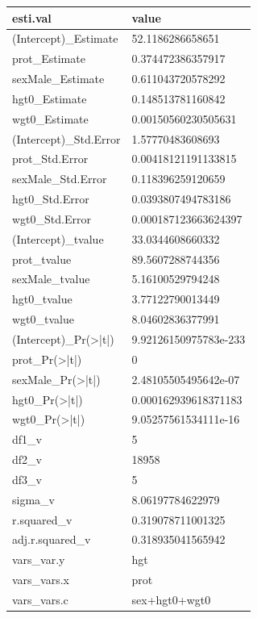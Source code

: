 \documentclass[
]{book}
\begin{document}
\begin{table}[!h]
\centering
\begin{tabular}{l|l}
\hline
esti.val & value\\
\hline
\rowcolor{gray!6}  (Intercept)\_Estimate & 52.1186286658651\\
\hline
prot\_Estimate & 0.374472386357917\\
\hline
\rowcolor{gray!6}  sexMale\_Estimate & 0.611043720578292\\
\hline
hgt0\_Estimate & 0.148513781160842\\
\hline
\rowcolor{gray!6}  wgt0\_Estimate & 0.00150560230505631\\
\hline
(Intercept)\_Std.Error & 1.57770483608693\\
\hline
\rowcolor{gray!6}  prot\_Std.Error & 0.00418121191133815\\
\hline
sexMale\_Std.Error & 0.118396259120659\\
\hline
\rowcolor{gray!6}  hgt0\_Std.Error & 0.0393807494783186\\
\hline
wgt0\_Std.Error & 0.000187123663624397\\
\hline
\rowcolor{gray!6}  (Intercept)\_tvalue & 33.0344608660332\\
\hline
prot\_tvalue & 89.5607288744356\\
\hline
\rowcolor{gray!6}  sexMale\_tvalue & 5.16100529794248\\
\hline
hgt0\_tvalue & 3.77122790013449\\
\hline
\rowcolor{gray!6}  wgt0\_tvalue & 8.04602836377991\\
\hline
(Intercept)\_Pr(>|t|) & 9.92126150975783e-233\\
\hline
\rowcolor{gray!6}  prot\_Pr(>|t|) & 0\\
\hline
sexMale\_Pr(>|t|) & 2.48105505495642e-07\\
\hline
\rowcolor{gray!6}  hgt0\_Pr(>|t|) & 0.000162939618371183\\
\hline
wgt0\_Pr(>|t|) & 9.05257561534111e-16\\
\hline
\rowcolor{gray!6}  df1\_v & 5\\
\hline
df2\_v & 18958\\
\hline
\rowcolor{gray!6}  df3\_v & 5\\
\hline
sigma\_v & 8.06197784622979\\
\hline
\rowcolor{gray!6}  r.squared\_v & 0.319078711001325\\
\hline
adj.r.squared\_v & 0.318935041565942\\
\hline
\rowcolor{gray!6}  vars\_var.y & hgt\\
\hline
vars\_vars.x & prot\\
\hline
\rowcolor{gray!6}  vars\_vars.c & sex+hgt0+wgt0\\
\hline
\end{tabular}
\end{table}
\end{document}
